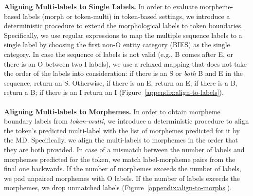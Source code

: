 \documentclass[11pt,a4paper]{article}
\begin{document}
{\bf Aligning Multi-labels to Single Labels.}
In order to evaluate morpheme-based labels (morph or token-multi) in token-based settings, we introduce a deterministic procedure to extend the morphological labels to token boundaries.
Specifically, we use regular expressions to map the multiple sequence labels  to a single label by choosing the first non-O entity category (BIES) as the single category. In case the sequence of labels is not valid (e.g., B comes after E, or there is an O between two I labels), we use a relaxed mapping that does not take the order of the labels into consideration: if there is an S or {\em both} B and E in the sequence, return an S. Otherwise, if there is an E, return an E; if there is a B, return a B; if there is an I return an I (Figure~\ref{appendix:align-to-labels}).
\\\\

\noindent
{\bf Aligning Multi-labels to Morphemes.}
In order to obtain morpheme boundary labels from \emph{token-multi}, we introduce a deterministic procedure to align the token's predicted multi-label with the list of  morphemes predicted for it by the MD. 
Specifically, we  align the multi-labels to  morphemes in the order that they are both provided. In  case of a mismatch between  the number of labels and morphemes predicted for the token, we match  label-morpheme pairs from the final one  backwards.  If the number of morphemes exceeds the number of labels, we pad unpaired morphemes with O labels. If the 
number of labels exceeds the   morphemes, we drop  unmatched labels (Figure~\ref{appendix:align-to-morphs}).
\end{document}
